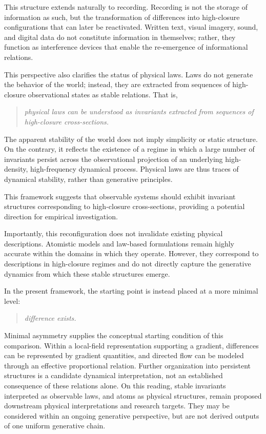 This structure extends naturally to recording.
Recording is not the storage of information as such, but the transformation of differences into
high-closure configurations that can later be reactivated.
Written text, visual imagery, sound, and digital data do not constitute information in themselves;
rather, they function as interference devices that enable the re-emergence of informational
relations.

This perspective also clarifies the status of physical laws.
Laws do not generate the behavior of the world; instead, they are extracted from sequences of
high-closure observational states as stable relations.
That is,
\begin{quote}
  \itshape
  physical laws can be understood as invariants extracted from sequences of high-closure
  cross-sections.
\end{quote}

The apparent stability of the world does not imply simplicity or static structure.
On the contrary, it reflects the existence of a regime in which a large number of invariants
persist across the observational projection of an underlying high-density, high-frequency
dynamical process.
Physical laws are thus traces of dynamical stability, rather than generative principles.

This framework suggests that observable systems should exhibit invariant
structures corresponding to high-closure cross-sections, providing a potential
direction for empirical investigation.

Importantly, this reconfiguration does not invalidate existing physical descriptions.
Atomistic models and law-based formulations remain highly accurate within the domains in which they
operate.
However, they correspond to descriptions in high-closure regimes and do not directly capture the
generative dynamics from which these stable structures emerge.

In the present framework, the starting point is instead placed at a more minimal level:
\begin{quote}
  \itshape
  difference exists.
\end{quote}
Minimal asymmetry supplies the conceptual starting condition of this comparison.
Within a local-field representation supporting a gradient, differences can be represented by
gradient quantities, and directed flow can be modeled through an effective proportional relation.
Further organization into persistent structures is a candidate dynamical interpretation, not an
established consequence of these relations alone.
On this reading, stable invariants interpreted as observable laws, and atoms as physical structures,
remain proposed downstream physical interpretations and research targets.
They may be considered within an ongoing generative perspective, but are not derived outputs of
one uniform generative chain.

